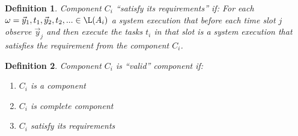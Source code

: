 \documentclass[ twoside, 12pt ]{article}
\newtheorem{dfn}{Definition} %
\begin{document}
\begin{dfn}
    Component $C_i$ ``satisfy its requirements'' if:
    For each $\omega = \vec{y}_1 , t_1 , \vec{y}_2 , t_2, ... \in \L(A_i)$ a system execution that before each time slot $j$ observe $\vec{y}_j$ and then execute the tasks $t_i$ in that slot is a system execution that satisfies the requirement from the component $C_i$.
\end{dfn}

\begin{dfn}
    Component $C_i$ is ``valid'' component if:
    \begin{enumerate}
        \item $C_i$ is a component
        
        \item $C_i$ is complete component
        
        \item $C_i$ satisfy its requirements
    \end{enumerate}
\end{dfn}
\end{document}
